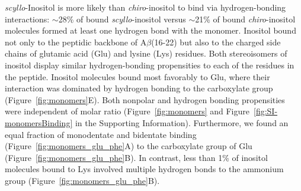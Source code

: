 \emph{scyllo}-Inositol is more likely than \emph{chiro}-inositol to bind via hydrogen-bonding interactions: $\sim$28\% of bound \emph{scyllo}-inositol versus $\sim$21\% of bound \emph{chiro}-inositol molecules formed at least one hydrogen bond with the monomer. Inositol bound not only to the peptidic backbone of A$\beta$(16-22) but also to the charged side chains of glutamic acid (Glu) and lysine (Lys) residues. Both stereoisomers of inositol display similar hydrogen-bonding propensities to each of the residues in the peptide. %
Inositol molecules bound most favorably to Glu, where their interaction was dominated by hydrogen bonding to the carboxylate group (Figure~\ref{fig:monomers}E). Both nonpolar and hydrogen bonding propensities were independent of molar ratio (Figure~{\ref{fig:monomers}} and Figure~{\ref{fig:SI-monomersBinding}} in the Supporting Information). Furthermore, we found an equal fraction of monodentate and bidentate binding (Figure~\ref{fig:monomers_glu_phe}A) to the carboxylate group of Glu (Figure~\ref{fig:monomers_glu_phe}B). In contrast, less than 1\% of inositol molecules bound to Lys involved multiple hydrogen bonds to the ammonium group (Figure~\ref{fig:monomers_glu_phe}B).

